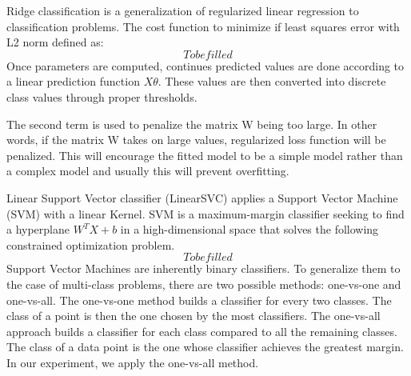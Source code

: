 Ridge classification is a generalization of regularized linear regression to classification problems. 
The cost function to minimize if least squares error with L2 norm defined as:
\begin{equation}
To be filled
\label{eq:ridge-cost}
\end{equation}
Once parameters are computed, continues predicted values are done according to a linear prediction function $X\theta$. These values are then converted into discrete class values through proper thresholds.


The second term is used to penalize the matrix W being too large. In other words, if the matrix W takes on large values, regularized loss function will be penalized. This will encourage the fitted model to be a simple model rather than a complex model and usually this will prevent overfitting. 

Linear Support Vector classifier (LinearSVC) applies a Support Vector Machine (SVM) with a linear Kernel. SVM is a maximum-margin classifier seeking to find a hyperplane $W^T X + b$ in a high-dimensional space that solves the following constrained optimization problem. 
\begin{equation}
To be filled
\label{eq:svm}
\end{equation}
Support Vector Machines are inherently binary classifiers. To generalize them to the case of multi-class problems, there are two possible methods: one-vs-one and one-vs-all. The one-vs-one method builds a classifier for every two classes. The class of a point is then the one chosen by the most classifiers. The one-vs-all approach builds a classifier for each class compared to all the remaining classes. The class of a data point is the one whose classifier achieves the greatest margin. In our experiment, we apply the one-vs-all method. 
 